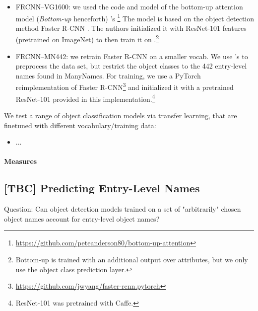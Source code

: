 \begin{itemize}
\item FRCNN--VG1600: we used the code and model of the bottom-up attention model (\textit{Bottom-up} henceforth)  \citeauthor{anderson2018updown}'s \citeyear{anderson2018updown} \footnote{\url{https://github.com/peteanderson80/bottom-up-attention}} The model is based on the object detection method Faster R-CNN \cite{fasterrcnn2015}. The authors initialized it with ResNet-101 \cite{he2016deep} features (pretrained on ImageNet) to then train it on \vg.\footnote{Bottom-up is trained with an additional output over attributes, but we only use the object class prediction layer.} 

\item FRCNN--MN442: we retrain Faster R-CNN \cite{fasterrcnn2015} on a smaller vocab. We use \citeauthor{anderson2018updown}'s to preprocess the data set, but restrict the object classes to the 442 entry-level names found in ManyNames. For training, we use a PyTorch reimplementation of Faster R-CNN\footnote{\url{https://github.com/jwyang/faster-rcnn.pytorch}} and initialized it with a pretrained ResNet-101 provided in this implementation.\footnote{ResNet-101 was pretrained with Caffe.}
\end{itemize}

We test a range of object classification models via transfer learning, that are finetuned with different vocabulary/training data:

\begin{itemize}
\item ...
\end{itemize}

\paragraph{Measures}


\subsection{[TBC] Predicting Entry-Level Names}
\label{sect:exp_entry}
Question: Can object detection models trained on a set of "arbitrarily" chosen object names account for entry-level object names? 

